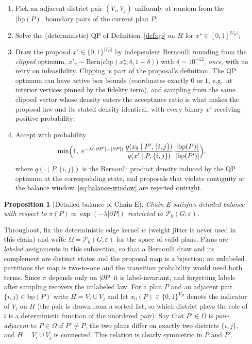 \documentclass[11pt]{article}
\newtheorem{proposition}{Proposition}[section]
\begin{document}
\begin{enumerate}
  \item Pick an adjacent district pair $(V_i, V_j)$ uniformly at random
    from the $|\mathrm{bp}(P)|$ boundary pairs of the current plan $P$;
  \item Solve the (deterministic) QP of Definition~\ref{def:qp} on
    $H$ for $x^\star \in [0,1]^{|V_H|}$;
  \item Draw the proposal $x' \in \{0,1\}^{|V_H|}$ by independent
    Bernoulli rounding from the \emph{clipped} optimum,
    $x'_v \sim \mathrm{Bern}\bigl(\mathrm{clip}(x^\star_v;
    \delta, 1-\delta)\bigr)$ with $\delta = 10^{-12}$,
    \emph{once}, with no retry on infeasibility. Clipping is part of the
    proposal's definition. The QP optimum can have active box bounds
    (coordinates exactly $0$ or $1$, e.g.\ at interior vertices pinned
    by the fidelity term), and sampling from the same clipped vector
    whose density enters the acceptance ratio is what makes the
    proposal law and its stated density identical, with every binary
    $x'$ receiving positive probability;
  \item Accept with probability
    \begin{equation}\label{eq:qpmh-accept}
      \min\Bigl(1,\;
      e^{-\lambda(|\partial P'| - |\partial P|)}\,
      \frac{q(x_0 \mid P', \{i,j\})}{q(x' \mid P, \{i,j\})}\,
      \frac{|\mathrm{bp}(P)|}{|\mathrm{bp}(P')|}\Bigr),
    \end{equation}
    where $q(\cdot \mid P, \{i,j\})$ is the Bernoulli product density
    induced by the QP optimum at the corresponding state, and proposals
    that violate contiguity or the balance
    window~\eqref{eq:balance-window} are rejected outright.
\end{enumerate}

\begin{proposition}[Detailed balance of Chain E]\label{prop:qpmh-db}
Chain E satisfies detailed balance with respect to
$\pi(P) \propto \exp(-\lambda |\partial P|)$ restricted to
$\mathcal{P}_k(G; \varepsilon)$.
\end{proposition}

Throughout, fix the deterministic edge kernel $w$ (weight jitter is
never used in this chain) and write $\Omega = \mathcal{P}_k(G;
\varepsilon)$ for the space of valid plans. Plans are \emph{labeled}
assignments in this subsection, so that a Bernoulli draw and its
complement are distinct states and the proposal map is a bijection;
on unlabeled partitions the map is two-to-one and the transition
probability would need both terms. Since $\pi$ depends only on
$|\partial P|$ it is label-invariant, and forgetting labels after
sampling recovers the unlabeled law. For a plan $P$ and an adjacent
pair $\{i,j\} \in \mathrm{bp}(P)$ write $H = V_i \cup V_j$ and let
$x_0(P) \in \{0,1\}^{V_H}$ denote the indicator of $V_i$ on $H$ (the
pair is drawn from a sorted list, so which district plays the role of
$i$ is a deterministic function of the unordered pair). Say that
$P' \in \Omega$ is \emph{pair-adjacent} to $P \in \Omega$ if
$P' \ne P$, the two plans differ on exactly two districts $\{i,j\}$,
and $H = V_i \cup V_j$ is connected. This relation is clearly
symmetric in $P$ and $P'$.
\end{document}
